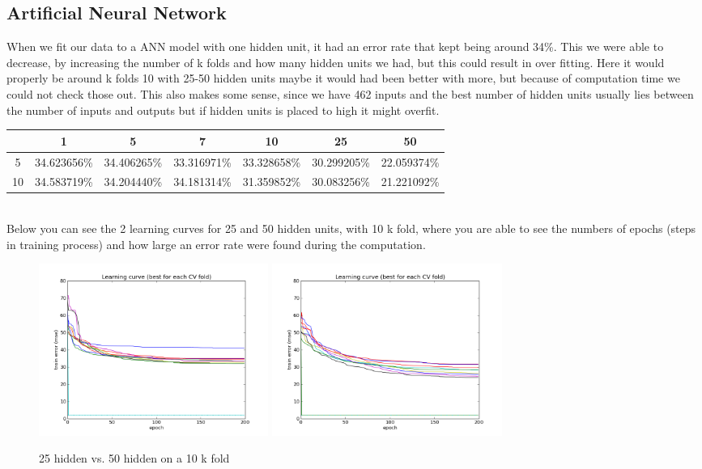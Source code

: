 \subsection{Artificial Neural Network}

When we fit our data to a ANN model with one hidden unit, it had an error rate that kept being around 34\%. This we were able to decrease, by increasing the number of k folds and how many hidden units we had, but this could result in over fitting. Here it would properly be around k folds 10 with 25-50 hidden units maybe it would had been better with more, but because of computation time we could not check those out. This also makes some sense, since we have 462 inputs and the best number of hidden units usually lies between the number of inputs and outputs but if hidden units is placed to high it might overfit.
\begin{table}[!h]
\begin{longtable}{ccccccc}
\hline 
   & 1 			 & 5 		   & 7 			 & 10		   & 25			 & 50 \\ \hline
5  & 34.623656\% & 34.406265\% & 33.316971\% & 33.328658\% & 30.299205\% & 22.059374\% \\ 
10 & 34.583719\% & 34.204440\% & 34.181314\% & 31.359852\% & 30.083256\% & 21.221092\% \\ \hline 
\end{longtable}
\end{table}
\\
Below you can see the 2 learning curves for 25 and 50 hidden units, with 10 k fold, where you are able to see the numbers of epochs (steps in training process) and how large an error rate were found during the computation.
\begin{figure}[!h]
\centering
\includegraphics[width=7.5cm, keepaspectratio=true]{pictures/ann_1_10_25.png}
\includegraphics[width=7.5cm, keepaspectratio=true]{pictures/ann_1_10_50.png}
\vspace{-0.4cm}
\caption{\footnotesize 25 hidden vs. 50 hidden on a 10 k fold}
\label{full_10_25_50}
\end{figure}
